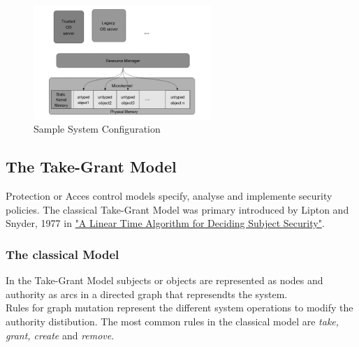 \documentclass[11pt,a4paper,twoside]{article}
\begin{document}
	\begin{figure}[ht]
	\centering
		\includegraphics[width=0.6\textwidth]{./Pictures/MemoryAllocation.png}
	\caption[Sample system architecture]{Sample System Configuration \cite{TakeG}}
	\label{fig:systarch}
	\end{figure}	
	
	\newpage
	\subsection{The Take-Grant Model}	
	Protection or Acces control models specify, analyse and implemente security policies. 
	The classical Take-Grant Model was primary introduced by Lipton and Snyder, 1977 in  \href{https://www.cs.nmt.edu/~doshin/t/s06/cs589/pub/2.JLS-TG.pdf}{%
		"A Linear Time Algorithm for Deciding Subject Security"}.
	\subsubsection{The classical Model}
	In the Take-Grant Model \cite{TakeG} subjects or objects are represented as nodes and authority as arcs in a directed graph that represendts the system. \\ 
	Rules for graph mutation represent the different system operations to modify  the authority distibution. 
	The most common rules in the classical model are \textit{take, grant, create} and \textit{remove}. 
	
\end{document}
